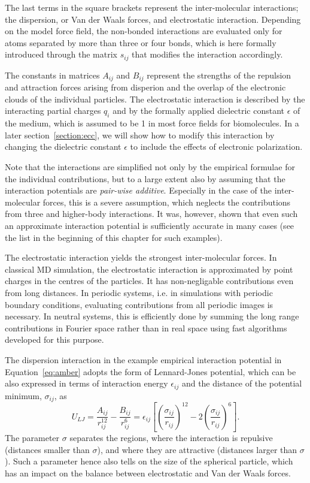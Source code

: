 The last terms in the square brackets represent the inter-molecular interactions; the dispersion, or Van der Waals forces, and electrostatic interaction. 
Depending on the model force field, the non-bonded interactions are evaluated only for atoms separated by more than three or four bonds, 
which is here formally introduced through the matrix $s_{ij}$ that modifies the interaction accordingly.

The constants in matrices $A_{ij}$ and $B_{ij}$ represent the strengths of the repulsion and attraction forces 
arising from disperion and the overlap of the electronic clouds of the individual particles.  
The electrostatic interaction is described by the interacting partial charges $q_i$ and by the formally applied dielectric constant $\epsilon$ of the medium, 
which is assumed to be 1 in most force fields for biomolecules. 
In a later section~\ref{section:ecc}, we will show how to modify this interaction 
by changing the dielectric constant $\epsilon$ to include the effects of electronic polarization. 

Note that the interactions are simplified not only by the empirical formulae for the individual contributions, 
but to a large extent also by assuming that the interaction potentials are \emph{pair-wise additive}. 
Especially in the case of the inter-molecular forces, this is a severe assumption, 
which neglects the contributions from three and higher-body interactions. 
It was, however, shown that even such an approximate interaction potential is sufficiently accurate in many cases 
(see the list in the beginning of this chapter for such examples). 

The electrostatic interaction yields the strongest inter-molecular forces. 
In classical MD simulation, the electrostatic interaction is approximated by point charges in the centres of the particles. 
It has non-negligable contributions even from long distances. 
In periodic systems, i.e. in simulations with periodic boundary conditions, 
evaluating contributions from all periodic images is necessary. 
In neutral systems, this is efficiently done by 
summing the long range contributions in Fourier space rather than in real space
using fast algorithms developed for this purpose. \citep{darden93, essman95}

The dispersion interaction in the example empirical interaction potential in Equation~\ref{eq:amber} adopts the form of Lennard-Jones potential, 
which can be also expressed in terms of interaction energy $\epsilon_{ij}$ and the distance of the potential minimum, $\sigma_{ij}$, as
\begin{equation}
   U_{LJ} =  \frac{A_{ij}}{r_{ij}^{12}} - \frac{B_{ij}}{r_{ij}^6} = \epsilon _{ij} \left [ \left (\frac{\sigma _{ij}}{r_{ij}} \right )^{12} - 2 \left ( \frac{\sigma _{ij}}{r_{ij}} \right )^6 \right ] .
\end{equation}
The parameter $\sigma$ separates the regions, 
where the interaction is repulsive (distances smaller than $\sigma$), 
and where they are attractive (distances larger than $\sigma$). 
Such a parameter hence also tells on the size of the spherical particle, 
which has an impact on the balance between electrostatic and Van der Waals forces.

